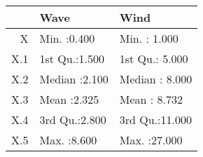 \begin{tabular}{rll}
  \toprule
 &      Wave &      Wind \\ 
  \midrule
X & Min.   :0.400   & Min.   : 1.000   \\ 
  X.1 & 1st Qu.:1.500   & 1st Qu.: 5.000   \\ 
  X.2 & Median :2.100   & Median : 8.000   \\ 
  X.3 & Mean   :2.325   & Mean   : 8.732   \\ 
  X.4 & 3rd Qu.:2.800   & 3rd Qu.:11.000   \\ 
  X.5 & Max.   :8.600   & Max.   :27.000   \\ 
   \bottomrule
\end{tabular}
